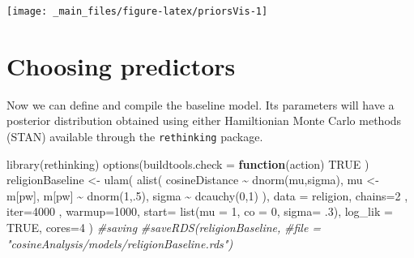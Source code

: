\documentclass[
  12pt,
]{book}
\newenvironment{Shaded}{\begin{snugshade}}{\end{snugshade}}
\newcommand{\AttributeTok}[1]{\textcolor[rgb]{0.77,0.63,0.00}{#1}}
\newcommand{\CommentTok}[1]{\textcolor[rgb]{0.56,0.35,0.01}{\textit{#1}}}
\newcommand{\ConstantTok}[1]{\textcolor[rgb]{0.00,0.00,0.00}{#1}}
\newcommand{\ControlFlowTok}[1]{\textcolor[rgb]{0.13,0.29,0.53}{\textbf{#1}}}
\newcommand{\DecValTok}[1]{\textcolor[rgb]{0.00,0.00,0.81}{#1}}
\newcommand{\FunctionTok}[1]{\textcolor[rgb]{0.00,0.00,0.00}{#1}}
\newcommand{\NormalTok}[1]{#1}
\newcommand{\OtherTok}[1]{\textcolor[rgb]{0.56,0.35,0.01}{#1}}
\newcommand{\SpecialCharTok}[1]{\textcolor[rgb]{0.00,0.00,0.00}{#1}}
\begin{document}
\vspace{2mm}

\begin{center}\texttt{[image: \_main\_files/figure-latex/priorsVis-1]} \end{center}

\hypertarget{choosing-predictors}{%
\section{Choosing predictors}\label{choosing-predictors}}

Now we can define and compile the baseline model. Its parameters will have a posterior distribution obtained using either Hamiltionian Monte Carlo methods (STAN) available through the \texttt{rethinking} package.

\vspace{1mm}
\footnotesize

\begin{Shaded}
\begin{Highlighting}[]
\FunctionTok{library}\NormalTok{(rethinking)}
\FunctionTok{options}\NormalTok{(}\AttributeTok{buildtools.check =} \ControlFlowTok{function}\NormalTok{(action) }\ConstantTok{TRUE}\NormalTok{ )}
\NormalTok{religionBaseline }\OtherTok{\textless{}{-}} \FunctionTok{ulam}\NormalTok{(}
  \FunctionTok{alist}\NormalTok{(}
\NormalTok{    cosineDistance }\SpecialCharTok{\textasciitilde{}} \FunctionTok{dnorm}\NormalTok{(mu,sigma),}
\NormalTok{    mu }\OtherTok{\textless{}{-}}\NormalTok{ m[pw],}
\NormalTok{    m[pw] }\SpecialCharTok{\textasciitilde{}} \FunctionTok{dnorm}\NormalTok{(}\DecValTok{1}\NormalTok{,.}\DecValTok{5}\NormalTok{),}
\NormalTok{    sigma }\SpecialCharTok{\textasciitilde{}} \FunctionTok{dcauchy}\NormalTok{(}\DecValTok{0}\NormalTok{,}\DecValTok{1}\NormalTok{)}
\NormalTok{  ),}
  \AttributeTok{data =}\NormalTok{ religion,}
  \AttributeTok{chains=}\DecValTok{2}\NormalTok{ , }\AttributeTok{iter=}\DecValTok{4000}\NormalTok{ , }\AttributeTok{warmup=}\DecValTok{1000}\NormalTok{,}
  \AttributeTok{start=} \FunctionTok{list}\NormalTok{(}\AttributeTok{mu =} \DecValTok{1}\NormalTok{, }\AttributeTok{co =} \DecValTok{0}\NormalTok{, }\AttributeTok{sigma=}\NormalTok{ .}\DecValTok{3}\NormalTok{),}
  \AttributeTok{log\_lik =} \ConstantTok{TRUE}\NormalTok{, }\AttributeTok{cores=}\DecValTok{4}
\NormalTok{)}
\CommentTok{\#saving}
\CommentTok{\#saveRDS(religionBaseline, }
\CommentTok{\#file = "cosineAnalysis/models/religionBaseline.rds")}
\end{Highlighting}
\end{Shaded}
\end{document}
